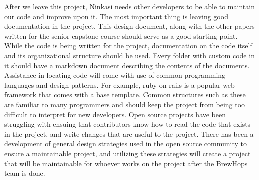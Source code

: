 \documentclass[draftclsnofoot,onecolumn,letterpaper,10pt]{IEEEtran}
\begin{document}
				After we leave this project, Ninkasi needs other developers to be able to maintain our code and improve upon it.
				The most important thing is leaving good documentation in the project.
				This design document, along with the other papers written for the senior capstone course should serve as a good starting point.
				While the code is being written for the project, documentation on the code itself and its organizational structure should be used.
				Every folder with custom code in it should have a markdown document describing the contents of the documents.
				Assistance in locating code will come with use of common programming languages and design patterns.
				For example, ruby on rails is a popular web framework that comes with a base template.
				Common structures such as these are familiar to many programmers and should keep the project from being too difficult to interpret for new developers.
				Open source projects have been struggling with ensuing that contributors know how to read the code that exists in the project, and write changes that are useful to the project.
				There has been a development of general design strategies used in the open source community to ensure a maintainable project, and utilizing these strategies will create a project that will be maintainable for whoever works on the project after the BrewHops team is done.

				\clearpage
\end{document}
